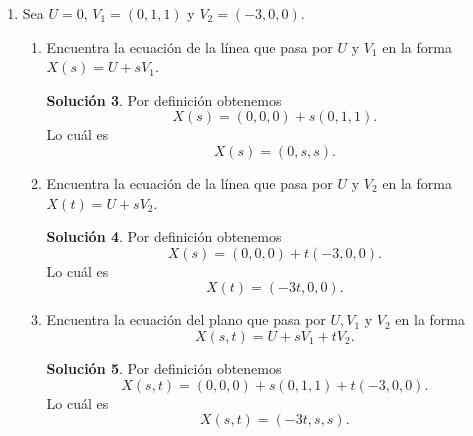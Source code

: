 \documentclass[letterpaper]{article}
\theoremstyle{definition}
\theoremstyle{lemathm}
\theoremstyle{lemathm}
\newtheorem{sol}{Solución}
\theoremstyle{lemathm}
\theoremstyle{lemademthm}
\newcommand{\pars}[1]{\left( #1 \right) }
\newcommand{\set}[1]{\left \{ #1 \right\} }
\newcommand{\1}{\mathbbm{1}}
\begin{document}
\begin{enumerate}
\begin{enumerate}
\begin{sol}
				\begin{align*}
					0 &= d\\
					b + c &= d\\
					-a &= d.
				\end{align*}

				Donde obtenemos que

				\[a = 0, \quad b = -c, \quad d = 0.\]

				Asignamos $b=1$ concluimos que

				\[S = \set{v=\pars{x,y,z} | y-z = 0}.\]
			\end{sol}

			\item El plano $S$ que contiene al punto $\pars{1,1,1}$ y es paralelo al plano $S'$ con ecuación $x-3y+5z=0$
			\begin{sol}
				Por definición el vector $(1,-3,5)$ es un vector ortogonal a $S'$. Luego al ser $S$ paralelo a $S'$ también $(1,-3,5)$ es un vector ortogonal a $S$, por lo tanto para todo vector $v=\pars{x,y,z}$ en $S$ se debe cumplir que

				\[x-3y+5z=0,\]

				como ${1,1,1}$ está en $S$ obtenemos que

				\[3 = 1-3+5 = d.\]

				Con lo cuál conclumos que la ecuación del plano $S$ es

				\[x-3y+5z=3.\]
			\end{sol}
		\end{enumerate}

		\item Sea $U = 0$, $V_1 = \pars{0,1,1}$ y $V_2 = \pars{-3,0,0}$.
		
		\begin{enumerate}
			\item Encuentra la ecuación de la línea que pasa por $U$ y $V_1$ en la forma $X(s) = U + sV_1$.
			\begin{sol}
				Por definición obtenemos
				\[X(s) = (0,0,0) + s(0,1,1).\]
				Lo cuál es
				\[X(s) = (0,s,s).\]
			\end{sol}
			\item Encuentra la ecuación de la línea que pasa por $U$ y $V_2$ en la forma $X(t) = U + sV_2$.
			\begin{sol}
				Por definición obtenemos
				\[X(s) = (0,0,0) + t(-3,0,0).\]
				Lo cuál es
				\[X(t) = (-3t,0,0).\]
			\end{sol}
			\item Encuentra la ecuación del plano que pasa por $U,V_1$ y $V_2$ en la forma 
			\[X(s,t) = U + sV_1 + tV_2.\]
			\begin{sol}
				Por definición obtenemos
				\[X(s,t) = (0,0,0) + s(0,1,1) + t(-3,0,0).\]
				Lo cuál es
				\[X(s,t) = (-3t,s,s).\]
			\end{sol}
		\end{enumerate}


\end{enumerate}
\end{document}
